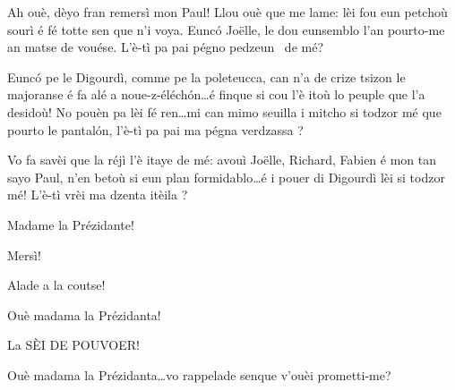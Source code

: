 \begin{drama}

\Presidanspeaks Ah ouè, dèyo fran remersì mon Paul! Llou ouè que me lame: lèi fou eun petchoù sourì é fé totte sen que n'i voya. Eunc\'o Jo\"{e}lle, le dou eunsemblo l'an pourto-me an matse de vouése. L’è-tì pa pai pégno pedzeun \pulcino\ de mé?


\Presidanspeaks Eunc\'o pe le Digourdì, comme pe la poleteucca, can n'a de crize tsizon le majoranse é fa alé a noue-z-éléch\'on\ldots é finque si cou l’è itoù lo peuple que l’a desidoù! No pouèn pa lèi fé ren\ldots mi can mimo seuilla i mitcho si todzor mé que pourto le pantal\'on, l'è-tì pa pai ma pégna verdzassa \scoiattolo ?


\Presidanspeaks Vo fa savèi que la réjì l’è itaye de mé: avouì Jo\"{e}lle, Richard, Fabien é  mon tan sayo Paul, 
n'en betoù si eun plan formidablo\ldots é i pouer di Digourdì lèi si todzor mé! L'è-tì vrèi ma dzenta itèila \stella ?


\Jordyspeaks Madame la Prézidante!

\Presidanspeaks {} Mersì!


\Presidanspeaks  Alade a la coutse!

\Jordyspeaks {} Ouè madama la Prézidanta!


\Presidanspeaks La SÈI DE POUVOER!

\Jordyspeaks Ouè madama la Prézidanta\ldots vo rappelade senque v'ouèi prometti-me?


\end{drama}
